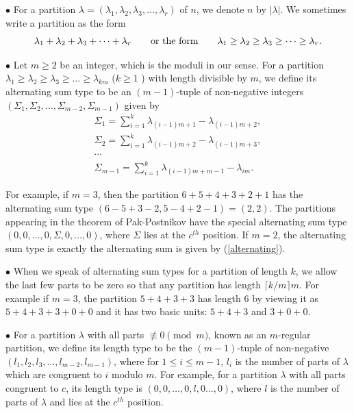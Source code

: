 \documentclass[11pt]{article}
\begin{document}
$\bullet$  For a partition $\lambda=(\lambda_1,\lambda_2, \lambda_{3},\dots,\lambda_{r})$ of $n$, we denote $n$ by $|\lambda |.$ We sometimes write a partition as the form
$$\lambda_1+\lambda_2+\lambda_3+\dots+\lambda_{r}  \quad \mbox{\quad or the form\quad} \quad   \lambda_1\geq\lambda_2\geq\lambda_{3}\geq\dots\geq\lambda_{r}.$$

$\bullet$ Let $m\geq 2$ be an integer, which is the moduli in our sense.  For a partition $\lambda_1\geq\lambda_2\geq\lambda_{3}\geq\dots\geq \lambda_{km}$ ($k\geq1$ ) with length divisible by $m$, we define its alternating sum type to be an $(m-1)$-tuple of non-negative integers $(\Sigma_{1},  \Sigma_{2},  \dots, \Sigma_{m-2},  \Sigma_{m-1})$ given by
\begin{gather*}
\Sigma_{1}=\sum_{i=1}^{k}\lambda_{(i-1)m+1}-\lambda_{(i-1)m+2},\\
 \Sigma_{2}=\sum_{i=1}^{k}\lambda_{(i-1)m+2}-\lambda_{(i-1)m+3},\\
   \cdots\\
    \Sigma_{m-1}=\sum_{i=1}^{k}\lambda_{(i-1)m+m-1}-\lambda_{im}.
\end{gather*}

For example, if $m=3$, then the partition $6+5+4+3+2+1$ has the alternating sum type $(6-5+3-2,5-4+2-1)=(2, 2)$. The partitions appearing in the theorem of Pak-Postnikov have the special alternating sum type $(0,0,\dots,0, \Sigma, 0,\dots,0)$, where $\Sigma$ lies at the $c^{th}$ position. If $m=2$, the alternating sum type is exactly the alternating sum is given by (\ref{alternating}). 



$\bullet$ When we speak of alternating sum types for a partition of length $k$, we allow the last few parts to be zero so that any partition has length $\lceil k/m \rceil m$. For example if $m=3$, the partition $5+4+3+3$ has length $6$ by viewing it as $5+4+3+3+0+0$ and it has two basic units: $5+4+3$ and $3+0+0.$

$\bullet$ For a partition $\lambda$ with all parts $\not\equiv 0\pmod m$, known as an $m$-regular partition, we define its length type to be the $(m-1)$-tuple of non-negative $(l_{1}, l_{2}, l_{3}, \dots, l_{m-2},  l_{m-1})$, where for $1\leq i\leq m-1$,  $l_{i}$ is the number of parts of $\lambda$ which are congruent to $i$ modulo $m$. For example, for a partition $\lambda$ with all parts congruent to $c$, its length type is $(0,0,\dots,0,l,0\dots,0)$, where $l$ is the number of parts of $\lambda$ and lies at the $c^{th}$ position.
\end{document}
